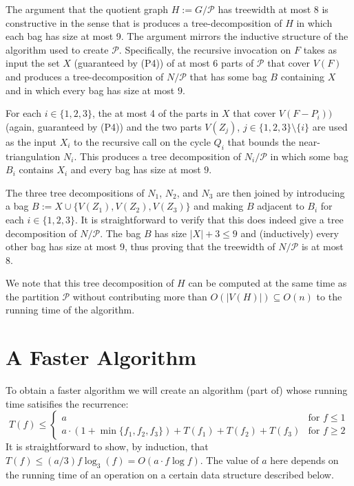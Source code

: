 \documentclass[kpfonts]{patmorin}
\let\le\leqslant
\let\ge\geqslant
\begin{document}
The argument that the quotient graph $H:=G/\mathcal{P}$ has treewidth at most $8$ is constructive in the sense that is produces a tree-decomposition of $H$ in which each bag has size at most 9.  The argument mirrors the inductive structure of the algorithm used to create $\mathcal{P}$.  Specifically, the recursive invocation on $F$ takes as input the set $X$ (guaranteed by (P4)) of at most 6 parts of $\mathcal{P}$ that cover $V(F)$ and produces a tree-decomposition of $N/\mathcal{P}$ that has some bag $B$ containing $X$ and in which every bag has size at most $9$.

For each $i\in\{1,2,3\}$, the at most 4 of the parts in $X$ that cover $V(F-P_i))$ (again, guaranteed by (P4)) and the two parts $V(Z_j)$, $j\in\{1,2,3\}\setminus\{i\}$ are used as the input $X_i$ to the recursive call on the cycle $Q_i$ that bounds the near-triangulation $N_i$. This produces a tree decomposition of $N_i/\mathcal{P}$ in which some bag $B_i$ contains $X_i$ and every bag has size at most $9$.

The three tree decompositions of $N_1$, $N_2$, and $N_3$ are then joined by introducing a bag $B:=X\cup\{V(Z_1),V(Z_2),V(Z_3)\}$ and making $B$ adjacent to $B_i$ for each $i\in\{1,2,3\}$.  It is straightforward to verify that this does indeed give a tree decomposition of $N/\mathcal{P}$.  The bag $B$ has size $|X|+3\le 9$ and (inductively) every other bag has size at most 9, thus proving that the treewidth of $N/\mathcal{P}$ is at most 8.

We note that this tree decomposition of $H$ can be computed at the same time as the partition $\mathcal{P}$ without contributing more than $O(|V(H)|)\subseteq O(n)$ to the running time of the algorithm.

\section{A Faster Algorithm}

To obtain a faster algorithm we will create an algorithm (part of) whose running time satisifies the recurrence:
\[  T(f) \le \begin{cases}
         a & \text{for $f\le 1$} \\
         a\cdot(1+\min\{f_1,f_2,f_3\}) + T(f_1)+T(f_2)+T(f_3) & \text{for $f\ge 2$}
       \end{cases}
\]
It is straightforward to show, by induction, that $T(f)\le (a/3)f\log_3(f)=O(a\cdot f\log f)$.  The value of $a$ here depends on the running time of an operation on a certain data structure described below.
\end{document}
